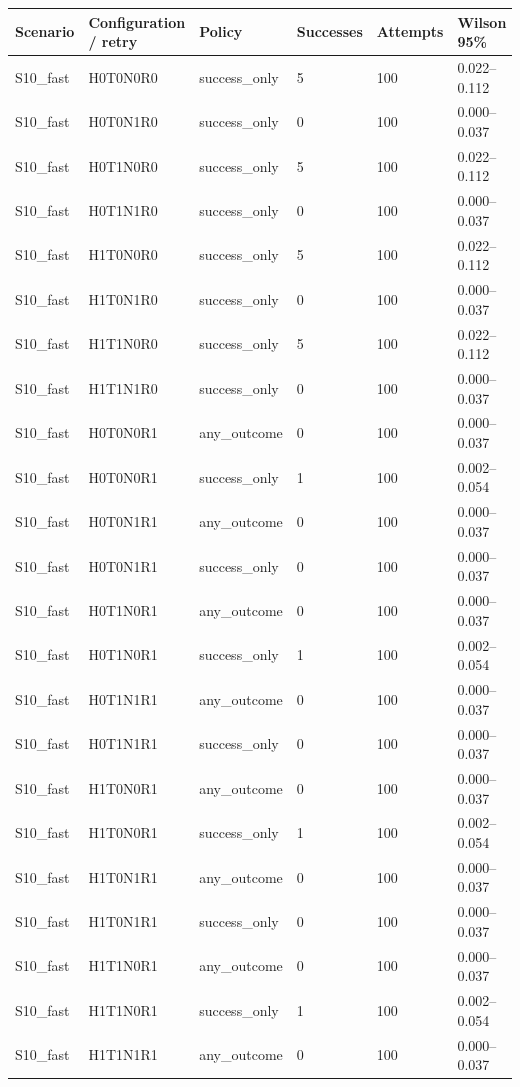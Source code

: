 \begin{table}[t]
\centering
\small
\begin{tabular}{llllll}
\toprule
Scenario & Configuration / retry & Policy & Successes & Attempts & Wilson 95\% \\
\midrule
S10\_fast & H0T0N0R0 & success\_only & 5 & 100 & 0.022–0.112 \\
S10\_fast & H0T0N1R0 & success\_only & 0 & 100 & 0.000–0.037 \\
S10\_fast & H0T1N0R0 & success\_only & 5 & 100 & 0.022–0.112 \\
S10\_fast & H0T1N1R0 & success\_only & 0 & 100 & 0.000–0.037 \\
S10\_fast & H1T0N0R0 & success\_only & 5 & 100 & 0.022–0.112 \\
S10\_fast & H1T0N1R0 & success\_only & 0 & 100 & 0.000–0.037 \\
S10\_fast & H1T1N0R0 & success\_only & 5 & 100 & 0.022–0.112 \\
S10\_fast & H1T1N1R0 & success\_only & 0 & 100 & 0.000–0.037 \\
S10\_fast & H0T0N0R1 & any\_outcome & 0 & 100 & 0.000–0.037 \\
S10\_fast & H0T0N0R1 & success\_only & 1 & 100 & 0.002–0.054 \\
S10\_fast & H0T0N1R1 & any\_outcome & 0 & 100 & 0.000–0.037 \\
S10\_fast & H0T0N1R1 & success\_only & 0 & 100 & 0.000–0.037 \\
S10\_fast & H0T1N0R1 & any\_outcome & 0 & 100 & 0.000–0.037 \\
S10\_fast & H0T1N0R1 & success\_only & 1 & 100 & 0.002–0.054 \\
S10\_fast & H0T1N1R1 & any\_outcome & 0 & 100 & 0.000–0.037 \\
S10\_fast & H0T1N1R1 & success\_only & 0 & 100 & 0.000–0.037 \\
S10\_fast & H1T0N0R1 & any\_outcome & 0 & 100 & 0.000–0.037 \\
S10\_fast & H1T0N0R1 & success\_only & 1 & 100 & 0.002–0.054 \\
S10\_fast & H1T0N1R1 & any\_outcome & 0 & 100 & 0.000–0.037 \\
S10\_fast & H1T0N1R1 & success\_only & 0 & 100 & 0.000–0.037 \\
S10\_fast & H1T1N0R1 & any\_outcome & 0 & 100 & 0.000–0.037 \\
S10\_fast & H1T1N0R1 & success\_only & 1 & 100 & 0.002–0.054 \\
S10\_fast & H1T1N1R1 & any\_outcome & 0 & 100 & 0.000–0.037 \\

\end{tabular}
\end{table}
